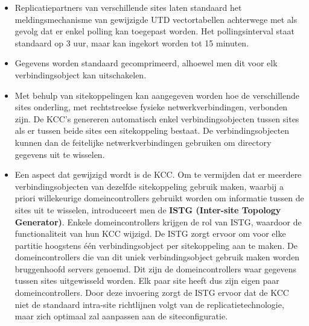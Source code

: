 \documentclass{report}
\begin{document}
\begin{enumerate}
		 { 
			\begin{itemize}
				\item Replicatiepartners van verschillende sites laten standaard het meldingsmechanisme van gewijzigde UTD vectortabellen achterwege met als gevolg dat er enkel polling kan toegepast worden. Het pollingsinterval staat standaard op 3 uur, maar kan ingekort worden tot 15 minuten.
				\item Gegevens worden standaard gecomprimeerd, alhoewel men dit voor elk verbindingsobject kan uitschakelen.
				\item Met behulp van sitekoppelingen kan aangegeven worden hoe de verschillende sites onderling, met rechtstreekse fysieke netwerkverbindingen, verbonden zijn. De KCC's genereren automatisch enkel verbindingsobjecten tussen sites als er tussen beide sites een sitekoppeling bestaat. De verbindingsobjecten kunnen dan de feitelijke netwerkverbindingen gebruiken om directory gegevens uit te wisselen. 
				\item Een aspect dat gewijzigd wordt is de KCC. Om te vermijden dat er meerdere verbindingsobjecten van dezelfde sitekoppeling gebruik maken, waarbij a priori willekeurige domeincontrollers gebruikt worden om informatie tussen de sites uit te wisselen, introduceert men de \textbf{ISTG (Inter-site Topology Generator)}. Enkele domeincontrollers krijgen de rol van ISTG, waardoor de functionaliteit van hun KCC wijzigd. De ISTG zorgt ervoor om voor elke partitie hoogstens één verbindingsobject per sitekoppeling aan te maken. De domeincontrollers die van dit uniek verbindingsobject gebruik maken worden bruggenhoofd servers genoemd. Dit zijn de domeincontrollers waar gegevens tussen sites uitgewisseld worden. Elk paar site heeft dus zijn eigen paar domeincontrollers. Door deze invoering zorgt de ISTG ervoor dat de KCC niet de standaard intra-site richtlijnen volgt van de replicatietechnologie, maar zich optimaal zal aanpassen aan de siteconfiguratie.
			\end{itemize}


		}
		

\end{enumerate}
\end{document}
